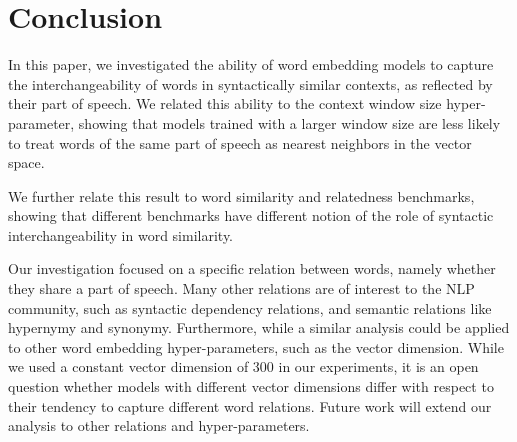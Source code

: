 \documentclass[11pt,a4paper]{article}
\begin{document}

\section{Conclusion}\label{sec:conclusion}

    In this paper, we investigated the ability of word embedding models
    to capture the interchangeability of words in syntactically similar contexts,
    as reflected by their part of speech.
    We related this ability to the context window size hyper-parameter,
    showing that models trained with a larger window size
    are less likely to treat words of the same part of speech as nearest neighbors
    in the vector space.

    We further relate this result to word similarity and relatedness benchmarks,
    showing that different benchmarks have different notion of the role of
    syntactic interchangeability in word similarity.
    
    Our investigation focused on a specific relation between words,
    namely whether they share a part of speech.
    Many other relations are of interest to the NLP
    community, such as syntactic dependency relations,
    and semantic relations like hypernymy and synonymy.
    Furthermore, while a similar analysis could be applied to other word
    embedding hyper-parameters, such as the vector dimension.
    While we used a constant vector dimension of 300 in our experiments,
    it is an open question whether models with different vector dimensions
    differ with respect to their tendency to capture different word relations.
    Future work will extend our analysis to other relations and hyper-parameters.

    
    
\end{document}
